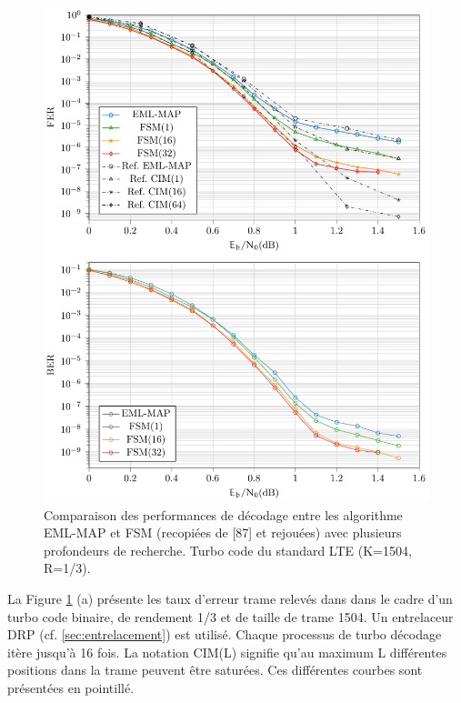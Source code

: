 \begin{figure}[!h]
	\centering
	\includegraphics[width=.9\textwidth]{main/ch2_fig/tikz/redec_fsm.pdf}
	\vspace*{.3cm}
	\caption{\label{fig:fsm}Comparaison des performances de décodage entre les algorithme EML-MAP et FSM (recopiées de [87] et rejouées) avec plusieurs 
	profondeurs de recherche. Turbo code du standard LTE (K=1504, R=1/3).}
\end{figure}

La Figure \ref{fig:fsm} (a) présente les taux d'erreur trame relevés dans \cite{cim} dans le cadre d'un turbo code binaire,
de rendement 1/3 et de taille de trame 1504. Un entrelaceur DRP (cf. \ref{sec:entrelacement})  est utilisé. Chaque processus de turbo décodage itère 
jusqu'à 16 fois. La notation CIM(L) signifie qu'au maximum L différentes positions dans la trame peuvent être saturées. 
Ces différentes courbes sont présentées en pointillé.


